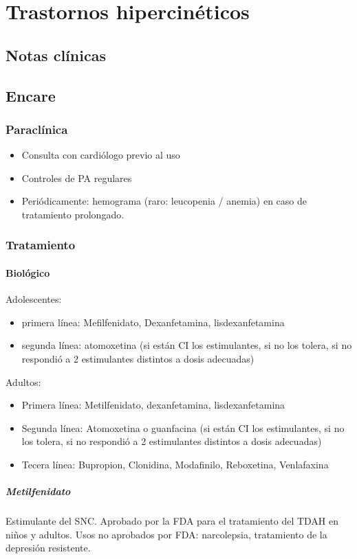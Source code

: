 \chapter*{Trastornos hipercinéticos}
\section*{Notas clínicas}
\section*{Encare}
\subsection*{Paraclínica}
\begin{itemize}
    \item Consulta con cardiólogo previo al uso
    \item Controles de PA regulares
    \item Periódicamente: hemograma (raro: leucopenia / anemia) en caso de tratamiento prolongado.
\end{itemize}
\subsection*{Tratamiento}
\subsubsection*{Biológico}
Adolescentes:
\begin{itemize}
    \item primera línea: Mefilfenidato, Dexanfetamina, lisdexanfetamina
    \item segunda línea: atomoxetina (si están CI los estimulantes, si no los tolera, si no respondió a 2 estimulantes distintos a dosis adecuadas)
\end{itemize}
Adultos:
\begin{itemize}
    \item Primera línea: Metilfenidato, dexanfetamina, lisdexanfetamina
    \item Segunda línea: Atomoxetina o guanfacina (si están CI los estimulantes, si no los tolera, si no respondió a 2 estimulantes distintos a dosis adecuadas)
    \item Tecera línea: Bupropion, Clonidina, Modafinilo, Reboxetina, Venlafaxina
\end{itemize}
\paragraph{Metilfenidato}
Estimulante del SNC\@.
Aprobado por la FDA para el tratamiento del TDAH en niños y adultos.
Usos no aprobados por FDA: narcolepsia, tratamiento de la depresión resistente.

